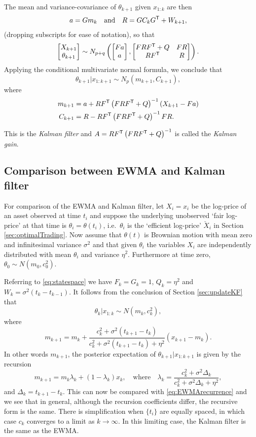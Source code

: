 The mean and variance-covariance of $\theta_{k+1}$ given $x_{1:k}$ are then  
$$a = G m_{k} \quad \text{and} \quad R = G C_{k} G^{\sf T} + W_{k+1},$$
(dropping subscripts for ease of notation), so that 
$$
\begin{bmatrix} X_{k+1} \\ \theta_{k+1} \end{bmatrix} \sim N_{p+q}\left(\begin{bmatrix} F a \\ a \end{bmatrix}, 
\begin{bmatrix}F R F^{\sf T} + Q & F R \\ RF^{\sf T} &R \end{bmatrix}\right).
$$
Applying the conditional multivariate normal formula, we conclude that
$$\theta_{k+1}|x_{1:k+1} \sim N_p(m_{k+1},C_{k+1}),$$
where
\begin{align*}m_{k+1} &= a + R F^{\sf T}\left(F R F ^{\sf T} +Q \right)^{-1}(X_{k+1} - F a)\\ 
C_{k+1} &= R -  R F^{\sf T}\left(F R F ^{\sf T} +Q \right)^{-1}F R.
\end{align*}

This is the \emph{Kalman filter} and  $A = R F ^{\sf T} \left(F R F ^{\sf T} +Q \right)^{-1}$ is called the \emph{Kalman gain}.  
\subsection{Comparison between EWMA and Kalman filter}\label{sec:EWMAKalman}
For comparison of the EWMA and Kalman filter, let $X_i = x_i$ be the log-price of an asset observed at time $t_i$ and suppose the underlying unobserved `fair log-price' at that time is $\theta_i = \theta(t_i)$, i.e.\ $\theta_i$ is the `efficient log-price' $\breve{X}_i$ in Section \ref{sec:optimalTrading}. Now assume that $\theta(t)$ is Brownian motion with mean zero and infinitesimal variance $\sigma^2$ and that given $\theta_i$ the variables $X_i$ are independently distributed with mean $\theta_i$ and variance $\eta^2$. Furthermore at time zero, $\theta_0 \sim N(m_0,c^2_0)$. 

Referring to \eqref{eq:statespace} we have 
$F_k = G_k = 1$, $Q_k = \eta^2$ and  $W_k = \sigma^2(t_k-t_{k-1})$. It follows from the conclusion of Section \ref{sec:updateKF} that
$$ \theta_k|x_{1:k} \sim N(m_k,c^2_k),$$
where 
$$m_{k+1} = m_{k} + \frac{c^2_{k} + \sigma^2 (t_{k+1} - t_{k})}{c^2_{k} + \sigma^2 (t_{k+1} - t_{k}) + \eta^2} \left(x_{k+1} - m_{k}\right).$$
In other words $m_{k+1}$, the posterior expectation of $\theta_{k+1}|x_{1:k+1}$ is given by the recursion
$$m_{k+1}  = m_{k}\lambda_k +  (1- \lambda_k) x_k, \quad \text{where} \quad \lambda_k = \frac{c^2_{k} + \sigma^2 \Delta_k}{c^2_{k} + \sigma^2 \Delta_k + \eta^2}, $$
and $\Delta_k = t_{k+1}- t_k$.  This can now be compared with \eqref{eq:EWMArecurrence} and we see that in general, although the recursion coefficients differ, the recursive form is the same. There is simplification when $\{t_i\}$ are equally spaced, in which case $c_k$ converges to a limit as $k\to \infty$. In this limiting case, the Kalman filter is the same as the EWMA. 


